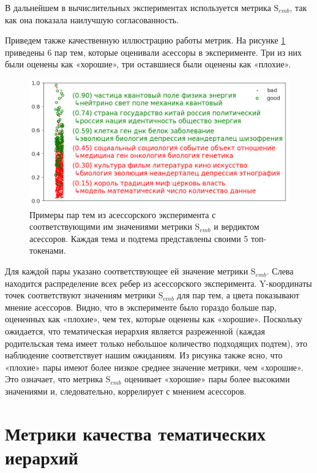 В дальнейшем в вычислительных экспериментах используется метрика $\mathrm{S}_{emb}$, так как она показала наилучшую согласованность.

Приведем также качественную иллюстрацию работы метрик. На рисунке \ref{fig:metrics_interpr} приведены 6 пар тем, которые оценивали асессоры в эксперименте. Три из них были оценены как «хорошие», три оставшиеся были оценены как «плохие». 

\begin{figure}[h!]
	\includegraphics[width=\textwidth]{img/metrics_interpr.png}
	\caption{\label{fig:metrics_interpr}Примеры пар тем из асессорского эксперимента с соответствующими им значениями метрики $\mathrm{S}_{emb}$ и вердиктом асессоров. Каждая тема и подтема представлены своими 5 топ-токенами.}
\end{figure}

Для каждой пары указано соответствующее ей значение метрики $\mathrm{S}_{emb}$. Слева находится распределение всех ребер из асессорского эксперимента. Y-координаты точек соответствуют значениям метрики $\mathrm{S}_{emb}$ для пар тем, а цвета показывают мнение асессоров. Видно, что в эксперименте было гораздо больше пар, оцененных как «плохие», чем тех, которые оценены как «хорошие». Поскольку ожидается, что тематическая иерархия является разреженной (каждая родительская тема имеет только небольшое количество подходящих подтем), это наблюдение соответствует нашим ожиданиям. Из рисунка также ясно, что «плохие» пары имеют более низкое среднее значение метрики, чем «хорошие». Это означает, что метрика $\mathrm{S}_{emb}$ оценивает «хорошие» пары более высокими значениями и, следовательно, коррелирует с мнением асессоров.

\section{Метрики качества тематических иерархий}

